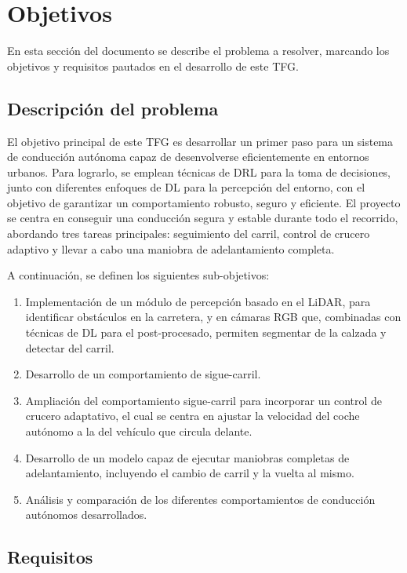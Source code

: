 \chapter{Objetivos}
\label{cap:capitulo2}

En esta sección del documento se describe el problema a resolver, marcando los objetivos y requisitos pautados en el desarrollo de este \ac{TFG}.

\section{Descripción del problema}
\label{sec:descripcion}

El objetivo principal de este \ac{TFG} es desarrollar un primer paso para un sistema de conducción autónoma capaz de desenvolverse eficientemente en entornos urbanos. Para lograrlo, se emplean técnicas de \ac{DRL} para la toma de decisiones, junto con diferentes enfoques de \ac{DL} para la percepción del entorno, con el objetivo de garantizar un comportamiento robusto, seguro y eficiente. El proyecto se centra en conseguir una conducción segura y estable durante todo el recorrido, abordando tres tareas principales: seguimiento del carril, control de crucero adaptivo y llevar a cabo una maniobra de adelantamiento completa.

A continuación, se definen los siguientes sub-objetivos: 

\begin{enumerate}
\item Implementación de un módulo de percepción basado en el \ac{LiDAR}, para identificar obstáculos en la carretera, y en cámaras RGB que, combinadas con técnicas de \ac{DL} para el post-procesado, permiten segmentar de la calzada y detectar del carril.
\item Desarrollo de un comportamiento de sigue-carril.
\item Ampliación del comportamiento sigue-carril para incorporar un control de crucero adaptativo, el cual se centra en ajustar la velocidad del coche autónomo a la del vehículo que circula delante.
\item Desarrollo de un modelo capaz de ejecutar maniobras completas de adelantamiento, incluyendo el cambio de carril y la vuelta al mismo.
\item Análisis y comparación de los diferentes comportamientos de conducción autónomos desarrollados.
\end{enumerate}

\section{Requisitos}
\label{sec:requisitos}

